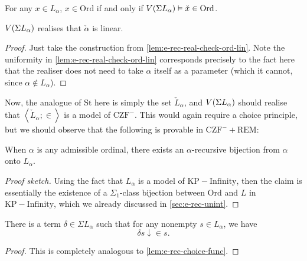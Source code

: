 \documentclass[12pt,openany]{book}
\theoremstyle{plain}
\theoremstyle{definition}
\newcommand\tuple[1]{\left\langle #1 \right\rangle}
\newcommand\KP{\mathrm{KP}}
\newcommand\CZF{\mathrm{CZF}}
\newcommand\REM{\mathrm{REM}}
\newcommand\Ord{\mathrm{Ord}}
\newcommand\St{\mathrm{St}}
\begin{document}
\begin{corollary}
  \label{cor:alpha-rec-real-check-ord-true}
  For any $x \in L_\alpha$, $x \in \Ord$ if and only if $V\mleft(\Sigma L_\alpha\mright) \vDash \check{x} \in \Ord$.
\end{corollary}

\begin{lemma}
  \label{lem:alpha-rec-real-check-ord-lin}
  $V\mleft(\Sigma L_\alpha\mright)$ realises that $\check{\alpha}$ is linear.
\end{lemma}

\begin{proof}
  Just take the construction from \autoref{lem:e-rec-real-check-ord-lin}. Note the uniformity in \autoref{lem:e-rec-real-check-ord-lin} corresponds precisely to the fact here that the realiser does not need to take $\alpha$ itself as a parameter (which it cannot, since $\alpha \not\in L_\alpha$).
\end{proof}

Now, the analogue of $\St$ here is simply the set $\check{L}_\alpha$, and $V\mleft(\Sigma L_\alpha\mright)$ should realise that $\tuple{\check{L}_\alpha; \in}$ is a model of $\CZF^-$. This would again require a choice principle, but we should observe that the following is provable in $\CZF^- + \REM$:
\begin{proposition}
  \label{prop:alpha-rec-bij-l-alpha}
  When $\alpha$ is any admissible ordinal, there exists an $\alpha$-recursive bijection from $\alpha$ onto $L_\alpha$.
\end{proposition}

\begin{proof}[Proof sketch]
  Using the fact that $L_\alpha$ is a model of $\KP - \text{Infinity}$, then the claim is essentially the existence of a $\Sigma_1$-class bijection between $\Ord$ and $L$ in $\KP - \text{Infinity}$, which we already discussed in \autoref{sec:e-rec-unint}.
\end{proof}

\begin{corollary}
  There is a term $\delta \in \Sigma L_\alpha$ such that for any nonempty $s \in L_\alpha$, we have
  \[\delta s {\downarrow} \in s.\]
\end{corollary}

\begin{proof}
  This is completely analogous to \autoref{lem:e-rec-choice-func}.
\end{proof}
\end{document}
